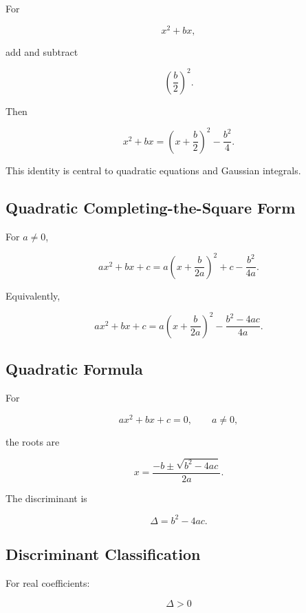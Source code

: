 For

\[
x^2+bx,
\]

add and subtract

\[
\left(
\frac{b}{2}
\right)^2.
\]

Then

\[
\boxed{
x^2+bx
=
\left(
x+\frac{b}{2}
\right)^2
-
\frac{b^2}{4}.
}
\]

This identity is central to quadratic equations and Gaussian integrals.

\subsection{Quadratic Completing-the-Square Form}
\label{subsec:quadratic-completing-square}

For \(a\neq0\),

\[
\boxed{
ax^2+bx+c
=
a
\left(
x+\frac{b}{2a}
\right)^2
+
c
-
\frac{b^2}{4a}.
}
\]

Equivalently,

\[
\boxed{
ax^2+bx+c
=
a
\left(
x+\frac{b}{2a}
\right)^2
-
\frac{b^2-4ac}{4a}.
}
\]

\subsection{Quadratic Formula}
\label{subsec:quadratic-formula-reference}

For

\[
ax^2+bx+c=0,
\qquad
a\neq0,
\]

the roots are

\[
\boxed{
x
=
\frac{
-b\pm\sqrt{b^2-4ac}
}{
2a
}.
}
\]

The discriminant is

\[
\boxed{
\Delta
=
b^2-4ac.
}
\]

\subsection{Discriminant Classification}
\label{subsec:discriminant-classification}

For real coefficients:

\[
\boxed{
\Delta>0
}
\]

